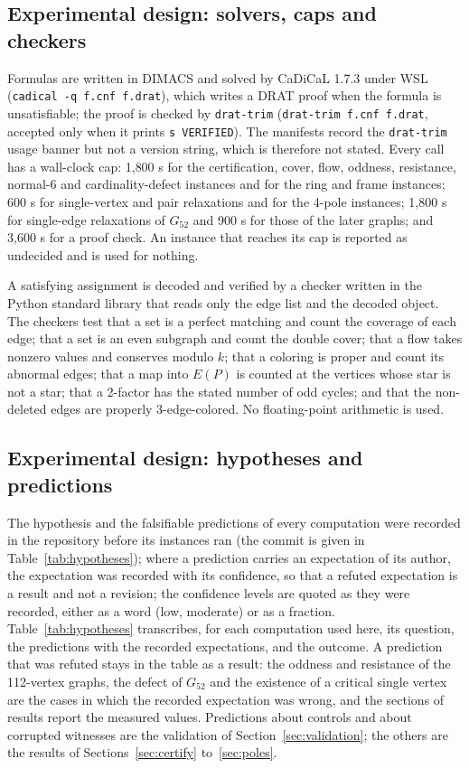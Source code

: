 \documentclass[11pt]{article}
\theoremstyle{definition}
\theoremstyle{remark}
\newcommand{\PG}{P}
\newcommand{\Gfty}{G_{52}}
\begin{document}
\subsection{Experimental design: solvers, caps and checkers}

Formulas are written in DIMACS and solved by CaDiCaL 1.7.3 under WSL (\texttt{cadical -q f.cnf
f.drat}), which writes a DRAT proof when the formula is unsatisfiable; the proof is checked by
\texttt{drat-trim} (\texttt{drat-trim f.cnf f.drat}, accepted only when it prints \texttt{s
VERIFIED}). The manifests record the \texttt{drat-trim} usage banner but not a version string, which
is therefore not stated. Every call has a wall-clock cap: 1{,}800 s for the certification, cover,
flow, oddness, resistance, normal-6 and cardinality-defect instances and for the ring and frame
instances; 600 s for single-vertex and pair relaxations and for the 4-pole instances; 1{,}800 s for
single-edge relaxations of $\Gfty$ and 900 s for those of the later graphs; and 3{,}600 s for a
proof check. An instance that reaches its cap is reported as undecided and is used for nothing.

A satisfying assignment is decoded and verified by a checker written in the Python standard library
that reads only the edge list and the decoded object. The checkers test that a set is a perfect
matching and count the coverage of each edge; that a set is an even subgraph and count the double
cover; that a flow takes nonzero values and conserves modulo $k$; that a coloring is proper and
count its abnormal edges; that a map into $E(\PG)$ is counted at the vertices whose star is not a
star; that a 2-factor has the stated number of odd cycles; and that the non-deleted edges are
properly 3-edge-colored. No floating-point arithmetic is used.

\subsection{Experimental design: hypotheses and predictions}

The hypothesis and the falsifiable predictions of every computation were recorded in the repository
before its instances ran (the commit is given in Table~\ref{tab:hypotheses}); where a prediction
carries an expectation of its author, the expectation was recorded with its confidence, so that a
refuted expectation is a result and not a revision; the confidence levels are quoted as they were
recorded, either as a word (low, moderate) or as a fraction. Table~\ref{tab:hypotheses} transcribes, for each
computation used here, its question, the predictions with the recorded expectations, and the outcome.
A prediction that was refuted stays in the table as a result: the oddness and resistance of the
112-vertex graphs, the defect of $\Gfty$ and the existence of a critical single vertex are the
cases in which the recorded expectation was wrong, and the sections of results report the measured
values. Predictions about controls and about corrupted witnesses are the validation of
Section~\ref{sec:validation}; the others are the results of Sections~\ref{sec:certify} to~\ref{sec:poles}.
\end{document}
